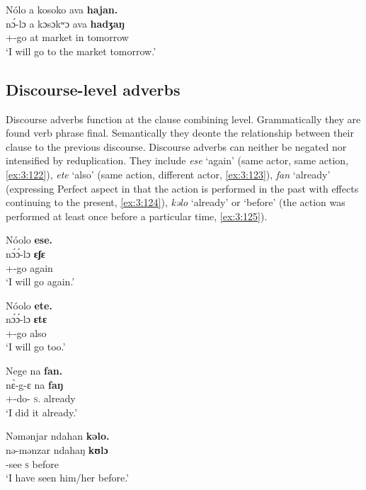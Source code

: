 \ea \label{ex:3:121}
Nólo  a  kosoko  ava \textbf{hajan.}\\
\gll  n\'{ɔ}-lɔ   a  kɔsɔkʷɔ  ava  \textbf{hadʒaŋ}\\
      {\oneS}+{\IFV}-go  at  market  in  tomorrow\\
\glt  ‘I will go to the market tomorrow.’
\z

\subsection{Discourse-level adverbs}\label{sec:3.5.4}
\hypertarget{RefHeading1211221525720847}{}
Discourse adverbs function at the clause combining level. Grammatically they are found verb phrase final. Semantically they deonte the relationship between their clause to the previous discourse. Discourse adverbs can neither be negated nor intensified by reduplication. They include \textit{ese} ‘again’ (same actor, same action, \ref{ex:3:122}), \textit{ete} ‘also’ (same action, different actor, \ref{ex:3:123}), \textit{fan} ‘already’ (expressing Perfect %
aspect in that the action is performed in the past with effects continuing to the present, \ref{ex:3:124}), \textit{kəlo} ‘already’ or ‘before’ (the action was performed at least once before a particular time, \ref{ex:3:125}). 

\ea \label{ex:3:122}
Nóolo  \textbf{ese.}\\
\gll  n\'{ɔ}\'{ɔ}-lɔ     \textbf{ɛʃɛ}\\
      {\oneS}+{\POT}-go    again\\
\glt  ‘I will go again.’
\z

\ea \label{ex:3:123}
Nóolo  \textbf{ete.}\\
\gll  n\'{ɔ}\'{ɔ}-lɔ     \textbf{ɛtɛ}\\
      {\oneS}+{\POT}-go    also\\
\glt  ‘I will go too.’
\z

\ea \label{ex:3:124}
Nege  na  \textbf{fan.}\\
\gll  n\`{ɛ}-g-ɛ    na  \textbf{faŋ}\\
      {\oneS}+{\PFV}-do-{\CL}  \textsc{s}.{\DO}  already\\
\glt  ‘I did it already.’
\z

\ea \label{ex:3:125}
Nəmənjar  ndahan  \textbf{kəlo.}\\
\gll  nə-mənzar    ndahaŋ  \textbf{kʊlɔ}\\
      {\oneS}-see  \textsc{s}  before\\
\glt  ‘I have seen him/her before.’
\z

